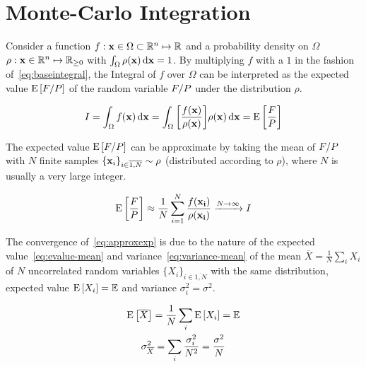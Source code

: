 
\section{Monte-Carlo Integration}
\label{sec:mcint}

Consider a function
\(f: \vb{x}\in\Omega\subset\mathbb{R}^n\mapsto\mathbb{R}\) and a
probability density on \(\Omega\)
\(\rho: \vb{x}\in\mathbb{R}^n\mapsto\mathbb{R}_{\geq 0}\) with
\(\int_{\Omega}\rho(\vb{x})\dd{\vb{x}} = 1\).  By multiplying \(f\)
with a \(1\) in the fashion of~\eqref{eq:baseintegral}, the Integral
of \(f\) over \(\Omega\) can be interpreted as the expected value
\(\operatorname{E}\qty[F/P]\) of the random variable \(F/P\)
under the distribution \(\rho\).

\begin{equation}
  \label{eq:baseintegral}
  I = \int_\Omega f(\vb{x}) \dd{\vb{x}} = \int_\Omega
  \qty[\frac{f(\vb{x})}{\rho(\vb{x})}] \rho(\vb{x}) \dd{\vb{x}} = \operatorname{E}\qty[\frac{F}{P}]
\end{equation}

The expected value \(\operatorname{E}\qty[F/P]\) can be approximate by taking the
mean of \(F/P\) with \(N\) finite samples
\(\{\vb{x}_i\}_{i\in\overline{1,N}}\sim\rho\) (distributed according to
\(\rho\)), where \(N\) is usually a very large integer.

\begin{equation}
  \label{eq:approxexp}
  \operatorname{E}\qty[\frac{F}{P}] \approx
  \frac{1}{N}\sum_{i=1}^N\frac{f(\vb{x_i})}{\rho(\vb{x_i})}
  \xrightarrow{N\rightarrow\infty} I
\end{equation}

The convergence of~\eqref{eq:approxexp} is due to the nature of the
expected value~\eqref{eq:evalue-mean} and
variance~\eqref{eq:variance-mean} of the mean
\(\overline{X} = \frac{1}{N}\sum_i X_i\) of \(N\) uncorrelated random
variables \(\{X_i\}_{i\in\overline{1,N}}\) with the same distribution,
expected value \(\operatorname{E}\qty[X_i]=\mathbb{E}\) and variance
\(\sigma_i^2 = \sigma^2\).

\begin{gather}
  \operatorname{E}\qty[\overline{X}] = \frac{1}{N}\sum_i\operatorname{E}\qty[X_i] = \mathbb{E} \label{eq:evalue-mean}\\
  \sigma^2_{\overline{X}} = \sum_i\frac{\sigma_i^2}{N^2} =
                            \frac{\sigma^2}{N}  \label{eq:variance-mean}
\end{gather}

